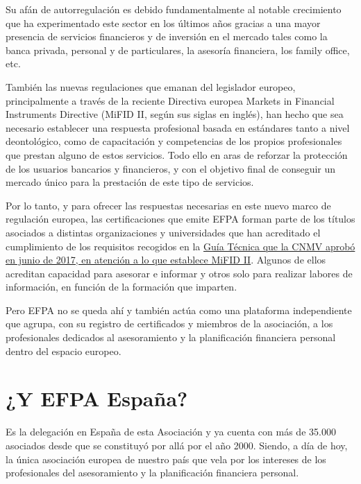 \documentclass[
  letterpaper,
  DIV=11,
  numbers=noendperiod]{scrreprt}
\begin{document}
Su afán de autorregulación es debido fundamentalmente al notable
crecimiento que ha experimentado este sector en los últimos años gracias
a una mayor presencia de servicios financieros y de inversión en el
mercado tales como la banca privada, personal y de particulares, la
asesoría financiera, los family office, etc.

También las nuevas regulaciones que emanan del legislador europeo,
principalmente a través de la reciente Directiva europea Markets in
Financial Instruments Directive (MiFID II, según sus siglas en inglés),
han hecho que sea necesario establecer una respuesta profesional basada
en estándares tanto a nivel deontológico, como de capacitación y
competencias de los propios profesionales que prestan alguno de estos
servicios. Todo ello en aras de reforzar la protección de los usuarios
bancarios y financieros, y con el objetivo final de conseguir un mercado
único para la prestación de este tipo de servicios.

Por lo tanto, y para ofrecer las respuestas necesarias en este nuevo
marco de regulación europea, las certificaciones que emite EFPA forman
parte de los títulos asociados a distintas organizaciones y
universidades que han acreditado el cumplimiento de los requisitos
recogidos en la
\href{https://cnmv.es/portal/Titulos-Acreditados-Listado.aspx}{Guía
Técnica que la CNMV aprobó en junio de 2017, en atención a lo que
establece MiFID II}. Algunos de ellos acreditan capacidad para asesorar
e informar y otros solo para realizar labores de información, en función
de la formación que imparten.

Pero EFPA no se queda ahí y también actúa como una plataforma
independiente que agrupa, con su registro de certificados y miembros de
la asociación, a los profesionales dedicados al asesoramiento y la
planificación financiera personal dentro del espacio europeo.

\hypertarget{y-efpa-espauxf1a}{%
\section*{\texorpdfstring{\textbf{¿Y EFPA
España?}}{¿Y EFPA España?}}\label{y-efpa-espauxf1a}}


Es la delegación en España de esta Asociación y ya cuenta con más de
35.000 asociados desde que se constituyó por allá por el año 2000.
Siendo, a día de hoy, la única asociación europea de nuestro país que
vela por los intereses de los profesionales del asesoramiento y la
planificación financiera personal.
\end{document}
